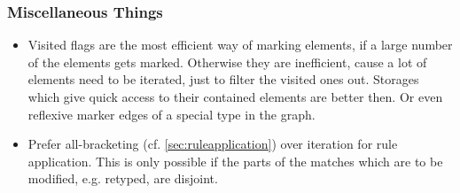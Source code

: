 \subsubsection*{Miscellaneous Things}
\begin{itemize}
  \item Visited flags are the most efficient way of marking elements, if a large number of the elements gets marked. Otherwise they are inefficient, cause a lot of elements need to be iterated, just to filter the visited ones out. Storages which give quick access to their contained elements are better then. Or even reflexive marker edges of a special type in the graph.
	\item Prefer all-bracketing (cf. \ref{sec:ruleapplication}) over iteration for rule application. This is only possible if the parts of the matches which are to be modified, e.g. retyped, are disjoint.
\end{itemize}
